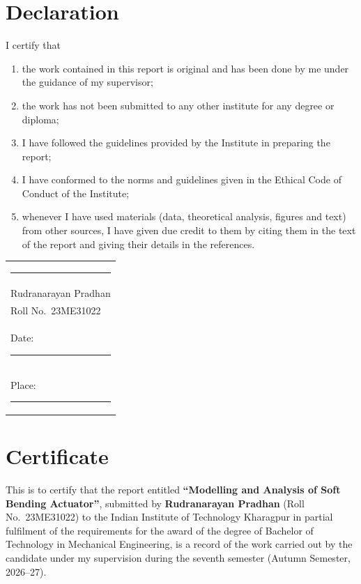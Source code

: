 \documentclass[12pt,a4paper,oneside]{report}
\numberwithin{equation}{chapter}
\numberwithin{figure}{chapter}
\numberwithin{table}{chapter}
\begin{document}
\chapter*{Declaration}
I certify that
\begin{enumerate}[label=(\alph*)]
\item the work contained in this report is original and has been done by me under the guidance of my
supervisor;
\item the work has not been submitted to any other institute for any degree or diploma;
\item I have followed the guidelines provided by the Institute in preparing the report;
\item I have conformed to the norms and guidelines given in the Ethical Code of Conduct of the Institute;
\item whenever I have used materials (data, theoretical analysis, figures and text) from other sources, I
have given due credit to them by citing them in the text of the report and giving their details in the
references.
\end{enumerate}

\vspace{2.5cm}
\noindent
\begin{tabular}{@{}l}
\rule{6cm}{0.4pt}\\
Rudranarayan Pradhan\\
Roll No.\ 23ME31022\\
Date: \rule{3cm}{0.4pt}\\
Place: \rule{3cm}{0.4pt}
\end{tabular}

\chapter*{Certificate}
This is to certify that the report entitled \textbf{``Modelling and Analysis of Soft Bending Actuator''}, submitted by \textbf{Rudranarayan Pradhan} (Roll No.\ 23ME31022) to the Indian Institute of
Technology Kharagpur in partial fulfilment of the requirements for the award of the degree of Bachelor of
Technology in Mechanical Engineering, is a record of the work carried out by the candidate under my
supervision during the seventh semester (Autumn Semester, 2026--27).
\end{document}
